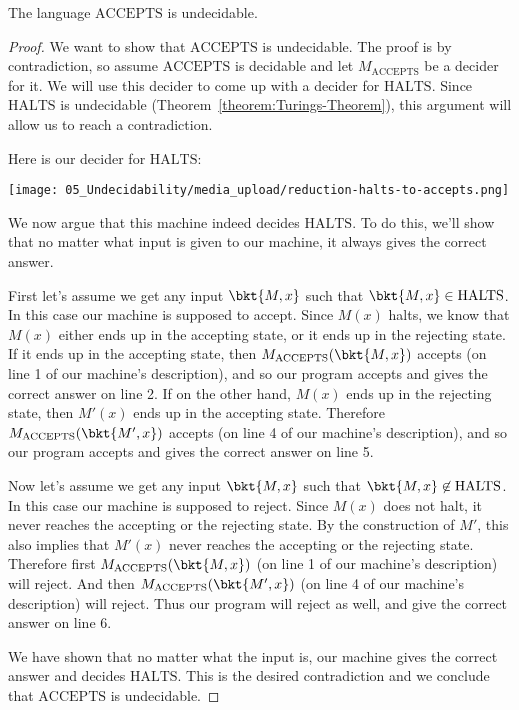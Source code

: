 \begin{flex}
\label{grp:theorem:mathrmACCEPTS-is-undecidable}

\begin{theorem}
\label{theorem:mathrmACCEPTS-is-undecidable}
The language $\mathrm{ACCEPTS}$ is undecidable.

\end{theorem}

\begin{proof}
\label{prf:Undecidable-Languages::want}
We want to show that $\text{ACCEPTS}$ is undecidable. The proof is by contradiction, so assume $\text{ACCEPTS}$ is decidable and let $M_\text{ACCEPTS}$ be a decider for it. We will use this decider to come up with a decider for $\text{HALTS}$. Since $\text{HALTS}$ is undecidable (Theorem~\ref{theorem:Turings-Theorem}), this argument will allow us to reach a contradiction.

Here is our decider for $\text{HALTS}$:

\begin{center}
\texttt{[image: 05\_Undecidability/media\_upload/reduction-halts-to-accepts.png]}
\end{center}

We now argue that this machine indeed decides $\text{HALTS}$. To do this, we'll show that no matter what input is given to our machine, it always gives the correct answer. 

First let's assume we get any input $\bkt{M,x}$ such that $\bkt{M,x} \in \text{HALTS}$. In this case our machine is supposed to accept. Since $M(x)$ halts, we know that $M(x)$ either ends up in the accepting state, or it ends up in the rejecting state. If it ends up in the accepting state, then $M_\text{ACCEPTS}(\bkt{M,x})$ accepts (on line 1 of our machine's description), and so our program accepts and gives the correct answer on line 2. If on the other hand, $M(x)$ ends up in the rejecting state, then $M'(x)$ ends up in the accepting state. Therefore $M_\text{ACCEPTS}(\bkt{M',x})$ accepts (on line 4 of our machine's description), and so our program accepts and gives the correct answer on line 5. 

Now let's assume we get any input $\bkt{M,x}$ such that $\bkt{M,x} \not \in \text{HALTS}$. In this case our machine is supposed to reject. Since $M(x)$ does not halt, it never reaches the accepting  or the rejecting state. By the construction of $M'$, this also implies that $M'(x)$ never reaches the accepting or the rejecting state. Therefore first $M_\text{ACCEPTS}(\bkt{M,x})$ (on line 1 of our machine's description) will reject. And then $M_\text{ACCEPTS}(\bkt{M',x})$ (on line 4 of our machine's description) will reject. Thus our program will reject as well, and give the correct answer on line 6.

We have shown that no matter what the input is, our machine gives the correct answer and decides $\text{HALTS}$. This is the desired contradiction and we conclude that $\text{ACCEPTS}$ is undecidable.

\end{proof}
\end{flex}

